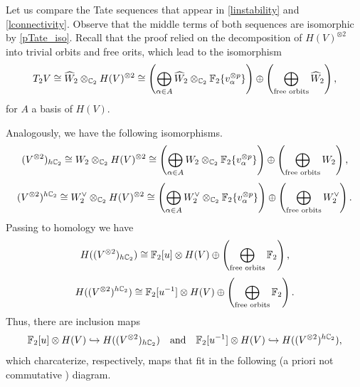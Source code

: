 \begin{remark}
	Let us compare the Tate sequences that appear in \cref{linstability} and \cref{lconnectivity}.
	Observe that the middle terms of both sequences are isomorphic by \cref{pTate_iso}.
	Recall that the proof relied on the decomposition of \(H(V)^{\otimes 2}\) into trivial orbits and free orits, which lead to the isomorphism
	\[
	T_2V \cong \widehat W_2 \otimes_{\mathbb{C}_2} H(V)^{\otimes 2} \cong \left(\bigoplus_{\alpha \in A} \widehat W_2 \otimes_{\mathbb{C}_2} {\mathbb{F}_2}\{v_\alpha^{\otimes p}\}\right) \oplus \left(\bigoplus_{\text{free orbits}} \widehat W_2\right),
	\]
	for \(A\) a basis of \(H(V)\).

	Analogously, we have the following isomorphisms.
	\[
	(V^{\otimes 2})_{h\mathbb{C}_2} \cong W_2 \otimes_{\mathbb{C}_2} H(V)^{\otimes 2} \cong \left(\bigoplus_{\alpha \in A} W_2 \otimes_{\mathbb{C}_2} {\mathbb{F}_2}\{v_\alpha^{\otimes p}\}\right) \oplus \left(\bigoplus_{\text{free orbits}} W_2\right),
	\]
	\[
	(V^{\otimes 2})^{h\mathbb{C}_2} \cong W_2^\vee \otimes_{\mathbb{C}_2} H(V)^{\otimes 2} \cong \left(\bigoplus_{\alpha \in A} W_2^\vee \otimes_{\mathbb{C}_2} {\mathbb{F}_2}\{v_\alpha^{\otimes p}\}\right) \oplus \left(\bigoplus_{\text{free orbits}} W_2^\vee \right).
	\]
	Passing to homology we have 
	\[
	H((V^{\otimes 2})_{h\mathbb{C}_2}) \cong {\mathbb{F}_2}[u] \otimes H(V) \oplus \left(\bigoplus_{\text{free orbits}} {\mathbb{F}_2} \right),
	\]
	\[
	H((V^{\otimes 2})^{h\mathbb{C}_2}) \cong {\mathbb{F}_2}[u^{-1}] \otimes H(V) \oplus \left(\bigoplus_{\text{free orbits}} {\mathbb{F}_2} \right).
	\]
Thus, there are inclusion maps
	\[
	{\mathbb{F}_2}[u]\otimes H(V) \hookrightarrow H((V^{\otimes 2})_{h\mathbb{C}_2}) \quad \text{and} \quad {\mathbb{F}_2}[u^{-1}]\otimes H(V) \hookrightarrow H((V^{\otimes 2})^{h\mathbb{C}_2}),
	\]
	which charcaterize, respectively, maps that fit in the following (a priori not commutative ) diagram.
		\begin{center}
	\end{center}
\end{remark}




